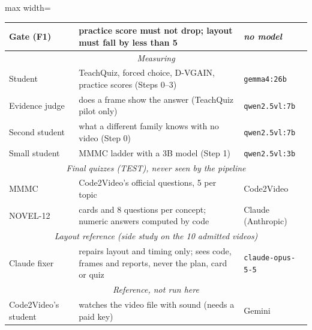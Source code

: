 \begin{table}[!tbp]
\begin{adjustbox}{max width=\linewidth}
\begin{tabular}{@{}lp{9.2cm}l@{}}
Gate (F1) & practice score must not drop; layout must fall by less than 5 & \textit{no model} \\
\midrule
\multicolumn{3}{c}{\textit{Measuring}}\\
Student & TeachQuiz, forced choice, D-VGAIN, practice scores (Steps 0--3) & \texttt{gemma4:26b} \\
Evidence judge & does a frame show the answer (TeachQuiz pilot only) & \texttt{qwen2.5vl:7b} \\
Second student & what a different family knows with no video (Step 0) & \texttt{qwen2.5vl:7b} \\
Small student & MMMC ladder with a 3B model (Step 1) & \texttt{qwen2.5vl:3b} \\
\midrule
\multicolumn{3}{c}{\textit{Final quizzes (TEST), never seen by the pipeline}}\\
MMMC & Code2Video's official questions, 5 per topic & Code2Video \\
NOVEL-12 & cards and 8 questions per concept; numeric answers computed by code & Claude (Anthropic) \\
\midrule
\multicolumn{3}{c}{\textit{Layout reference (side study on the 10 admitted videos)}}\\
Claude fixer & repairs layout and timing only; sees code, frames and reports, never the plan, card or quiz & \texttt{claude-opus-5-5} \\
\midrule
\multicolumn{3}{c}{\textit{Reference, not run here}}\\
Code2Video's student & watches the video file with sound (needs a paid key) & Gemini \\
\bottomrule\end{tabular}\end{adjustbox}
\end{table}
